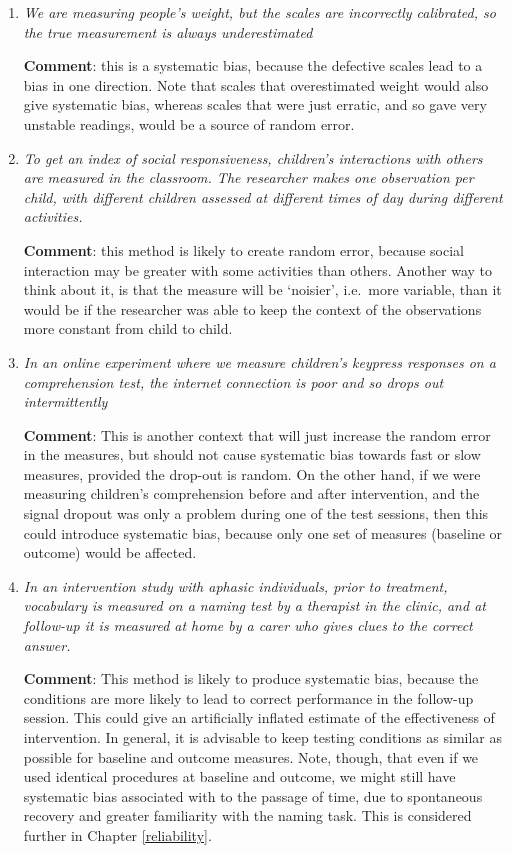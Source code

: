 \documentclass{krantz}
\begin{document}
\begin{enumerate}
\def\labelenumi{\arabic{enumi}.}
\item
  \emph{We are measuring people's weight, but the scales are incorrectly calibrated, so the true measurement is always underestimated}

  \textbf{Comment}: this is a systematic bias, because the defective scales lead to a bias in one direction. Note that scales that overestimated weight would also give systematic bias, whereas scales that were just erratic, and so gave very unstable readings, would be a source of random error.
\item
  \emph{To get an index of social responsiveness, children's interactions with others are measured in the classroom. The researcher makes one observation per child, with different children assessed at different times of day during different activities.}

  \textbf{Comment}: this method is likely to create random error, because social interaction may be greater with some activities than others. Another way to think about it, is that the measure will be `noisier', i.e.~more variable, than it would be if the researcher was able to keep the context of the observations more constant from child to child.
\item
  \emph{In an online experiment where we measure children's keypress responses on a comprehension test, the internet connection is poor and so drops out intermittently}

  \textbf{Comment}: This is another context that will just increase the random error in the measures, but should not cause systematic bias towards fast or slow measures, provided the drop-out is random. On the other hand, if we were measuring children's comprehension before and after intervention, and the signal dropout was only a problem during one of the test sessions, then this could introduce systematic bias, because only one set of measures (baseline or outcome) would be affected.
\item
  \emph{In an intervention study with aphasic individuals, prior to treatment, vocabulary is measured on a naming test by a therapist in the clinic, and at follow-up it is measured at home by a carer who gives clues to the correct answer.}

  \textbf{Comment}: This method is likely to produce systematic bias, because the conditions are more likely to lead to correct performance in the follow-up session. This could give an artificially inflated estimate of the effectiveness of intervention. In general, it is advisable to keep testing conditions as similar as possible for baseline and outcome measures. Note, though, that even if we used identical procedures at baseline and outcome, we might still have systematic bias associated with to the passage of time, due to spontaneous recovery and greater familiarity with the naming task. This is considered further in Chapter \ref{reliability}.
\end{enumerate}
\end{document}
